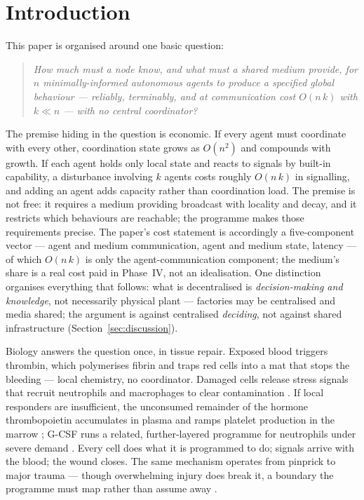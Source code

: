 \documentclass[twoside,twocolumn,usenatbib]{mnras}
\begin{document}
\section{Introduction}

\label{sec:intro}

This paper is organised around one basic question:

\begin{quote}
\emph{How much must a node know, and what must a shared medium provide, for
$n$ minimally-informed autonomous agents to produce a specified global
behaviour --- reliably, terminably, and at communication cost $O(n\,k)$
with $k \ll n$ --- with no central coordinator?}
\end{quote}

The premise hiding in the question is economic. If every agent must
coordinate with every other, coordination state grows as $O(n^2)$ and
compounds with growth. If each agent holds only local state and reacts to
signals by built-in capability, a disturbance involving $k$ agents costs
roughly $O(n\,k)$ in signalling, and adding an agent adds capacity
rather than coordination load. The premise is not free: it requires a
medium providing broadcast with locality and decay, and it restricts
which behaviours are reachable; the programme makes those requirements
precise. The paper's cost statement is accordingly a five-component
vector --- agent and medium communication, agent and medium state,
latency --- of which $O(n\,k)$ is only the agent-communication
component; the medium's share is a real cost paid in Phase~IV, not an
idealisation. One distinction organises everything that follows:
what is decentralised is \emph{decision-making and knowledge}, not
necessarily physical plant --- factories may be centralised and media
shared; the argument is against centralised \emph{deciding}, not against
shared infrastructure (Section~\ref{sec:discussion}).

Biology answers the question once, in tissue repair. Exposed blood
triggers thrombin, which polymerises fibrin and traps red cells into a
mat that stops the bleeding --- local chemistry, no coordinator. Damaged
cells release stress signals that recruit neutrophils and macrophages to
clear contamination \citep{medzhitov2008}. If local responders are
insufficient, the unconsumed remainder of the hormone thrombopoietin
accumulates in plasma and ramps platelet
production in the marrow \citep{kaushansky2005}; G-CSF runs a related,
further-layered programme for neutrophils under severe demand
\citep{manz2014}. Every cell does what it
is programmed to do; signals arrive with the blood; the wound closes.
The same mechanism operates from pinprick to major trauma --- though
overwhelming injury does break it, a boundary the programme must map
rather than assume away \citep{gurtner2008}.
\end{document}
